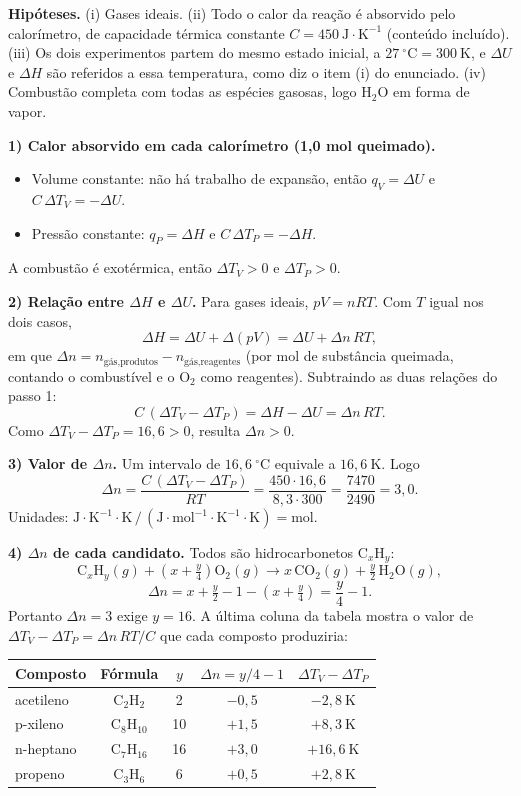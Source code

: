 \documentclass{article}%
\begin{document}
\textbf{Hipóteses.} (i) Gases ideais. (ii) Todo o calor da reação é absorvido pelo calorímetro, de capacidade térmica constante $C=450\ \text{J}\cdot\text{K}^{-1}$ (conteúdo incluído). (iii) Os dois experimentos partem do mesmo estado inicial, a $27\ ^\circ\text{C}=300\ \text{K}$, e $\Delta U$ e $\Delta H$ são referidos a essa temperatura, como diz o item (i) do enunciado. (iv) Combustão completa com todas as espécies gasosas, logo $\text{H}_2\text{O}$ em forma de vapor.

\textbf{1) Calor absorvido em cada calorímetro (1,0 mol queimado).}
\begin{itemize}
\item Volume constante: não há trabalho de expansão, então $q_V=\Delta U$ e $C\,\Delta T_V=-\Delta U$.
\item Pressão constante: $q_P=\Delta H$ e $C\,\Delta T_P=-\Delta H$.
\end{itemize}
A combustão é exotérmica, então $\Delta T_V>0$ e $\Delta T_P>0$.

\textbf{2) Relação entre $\Delta H$ e $\Delta U$.}
Para gases ideais, $pV=nRT$. Com $T$ igual nos dois casos,
\[
\Delta H=\Delta U+\Delta(pV)=\Delta U+\Delta n\,RT,
\]
em que $\Delta n=n_{\text{gás,produtos}}-n_{\text{gás,reagentes}}$ (por mol de substância queimada, contando o combustível e o $\text{O}_2$ como reagentes). Subtraindo as duas relações do passo 1:
\[
C\,(\Delta T_V-\Delta T_P)=\Delta H-\Delta U=\Delta n\,RT .
\]
Como $\Delta T_V-\Delta T_P=16{,}6>0$, resulta $\Delta n>0$.

\textbf{3) Valor de $\Delta n$.}
Um intervalo de $16{,}6\ ^\circ\text{C}$ equivale a $16{,}6\ \text{K}$. Logo
\[
\Delta n=\frac{C\,(\Delta T_V-\Delta T_P)}{RT}=\frac{450\cdot 16{,}6}{8{,}3\cdot 300}=\frac{7470}{2490}=3{,}0 .
\]
Unidades: $\text{J}\cdot\text{K}^{-1}\cdot\text{K}\,/\,(\text{J}\cdot\text{mol}^{-1}\cdot\text{K}^{-1}\cdot\text{K})=\text{mol}$.

\textbf{4) $\Delta n$ de cada candidato.}
Todos são hidrocarbonetos $\text{C}_x\text{H}_y$:
\[
\text{C}_x\text{H}_y(g)+\left(x+\tfrac{y}{4}\right)\text{O}_2(g)\longrightarrow x\,\text{CO}_2(g)+\tfrac{y}{2}\,\text{H}_2\text{O}(g),
\]
\[
\Delta n=x+\tfrac{y}{2}-1-\left(x+\tfrac{y}{4}\right)=\frac{y}{4}-1 .
\]
Portanto $\Delta n=3$ exige $y=16$. A última coluna da tabela mostra o valor de $\Delta T_V-\Delta T_P=\Delta n\,RT/C$ que cada composto produziria:

\begin{center}
\begin{tabular}{lcccc}
Composto & Fórmula & $y$ & $\Delta n=y/4-1$ & $\Delta T_V-\Delta T_P$ \\ \hline
acetileno & $\text{C}_2\text{H}_2$ & 2 & $-0{,}5$ & $-2{,}8\ \text{K}$ \\
p-xileno & $\text{C}_8\text{H}_{10}$ & 10 & $+1{,}5$ & $+8{,}3\ \text{K}$ \\
n-heptano & $\text{C}_7\text{H}_{16}$ & 16 & $+3{,}0$ & $+16{,}6\ \text{K}$ \\
propeno & $\text{C}_3\text{H}_6$ & 6 & $+0{,}5$ & $+2{,}8\ \text{K}$ \\
\end{tabular}
\end{center}
\end{document}
